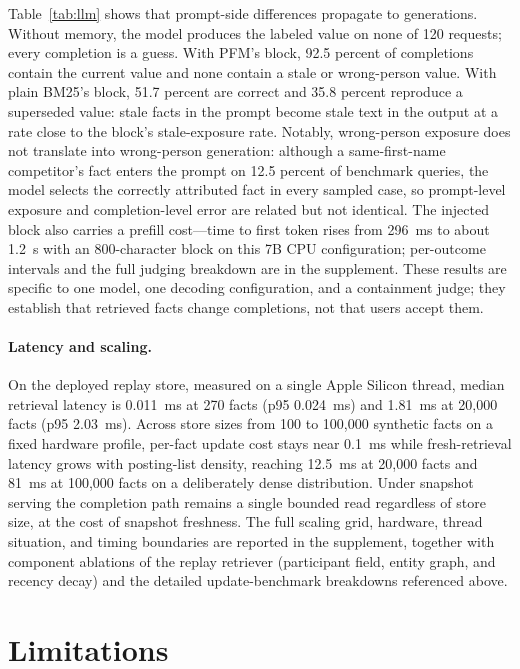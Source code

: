 \documentclass[letterpaper]{article} %
\begin{document}
Table~\ref{tab:llm} shows that prompt-side differences propagate to generations. Without memory, the model produces the labeled value on none of 120 requests; every completion is a guess. With PFM's block, 92.5 percent of completions contain the current value and none contain a stale or wrong-person value. With plain BM25's block, 51.7 percent are correct and 35.8 percent reproduce a superseded value: stale facts in the prompt become stale text in the output at a rate close to the block's stale-exposure rate. Notably, wrong-person exposure does not translate into wrong-person generation: although a same-first-name competitor's fact enters the prompt on 12.5 percent of benchmark queries, the model selects the correctly attributed fact in every sampled case, so prompt-level exposure and completion-level error are related but not identical. The injected block also carries a prefill cost---time to first token rises from 296~ms to about 1.2~s with an 800-character block on this 7B CPU configuration; per-outcome intervals and the full judging breakdown are in the supplement. These results are specific to one model, one decoding configuration, and a containment judge; they establish that retrieved facts change completions, not that users accept them.

\paragraph{Latency and scaling.} On the deployed replay store, measured on a single Apple Silicon thread, median retrieval latency is 0.011~ms at 270 facts (p95 0.024~ms) and 1.81~ms at 20{,}000 facts (p95 2.03~ms). Across store sizes from 100 to 100{,}000 synthetic facts on a fixed hardware profile, per-fact update cost stays near 0.1~ms while fresh-retrieval latency grows with posting-list density, reaching 12.5~ms at 20{,}000 facts and 81~ms at 100{,}000 facts on a deliberately dense distribution. Under snapshot serving the completion path remains a single bounded read regardless of store size, at the cost of snapshot freshness. The full scaling grid, hardware, thread situation, and timing boundaries are reported in the supplement, together with component ablations of the replay retriever (participant field, entity graph, and recency decay) and the detailed update-benchmark breakdowns referenced above.

\section{Limitations}
\end{document}

